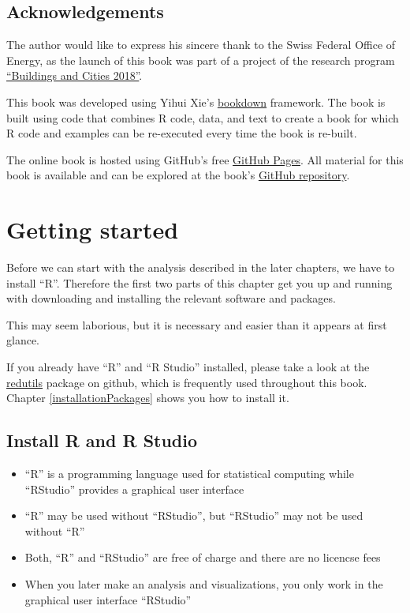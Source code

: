 \documentclass[
  a4paperpaper,
]{book}
\providecommand{\tightlist}{%
  \setlength{\itemsep}{0pt}\setlength{\parskip}{0pt}}
\begin{document}
\newpage

\hypertarget{acknowledgements}{%
\section{Acknowledgements}\label{acknowledgements}}

The author would like to express his sincere thank to the Swiss Federal Office of Energy, as the launch of this book was part of a project of the research program \href{https://www.bfe.admin.ch/bfe/de/home/forschung-und-cleantech/forschungsprogramme/gebaeude-und-staedte.html}{``Buildings and Cities 2018''}.

This book was developed using Yihui Xie's \href{https://bookdown.org}{bookdown} framework. The book is built using code that combines R code, data, and text to create a book for which R code and examples can be re-executed every time the book is re-built.

The online book is hosted using GitHub's free \href{https://pages.github.com}{GitHub Pages}. All material for this book is available and can be explored at the book's \href{https://github.com/hslu-ige-laes/edar}{GitHub repository}.

\hypertarget{getting-started}{%
\chapter{Getting started}\label{getting-started}}

Before we can start with the analysis described in the later chapters, we have to install ``R''.
Therefore the first two parts of this chapter get you up and running with downloading and installing the relevant software and packages.

This may seem laborious, but it is necessary and easier than it appears at first glance.

If you already have ``R'' and ``R Studio'' installed, please take a look at the \href{https://github.com/hslu-ige-laes/redutils}{redutils} package on github, which is frequently used throughout this book. Chapter \ref{installationPackages} shows you how to install it.

\hypertarget{installation}{%
\section{Install R and R Studio}\label{installation}}

\begin{itemize}
\tightlist
\item
  ``R'' is a programming language used for statistical computing while ``RStudio'' provides a graphical user interface
\item
  ``R'' may be used without ``RStudio'', but ``RStudio'' may not be used without ``R''
\item
  Both, ``R'' and ``RStudio'' are free of charge and there are no licencse fees
\item
  When you later make an analysis and visualizations, you only work in the graphical user interface ``RStudio''
\end{itemize}
\end{document}
